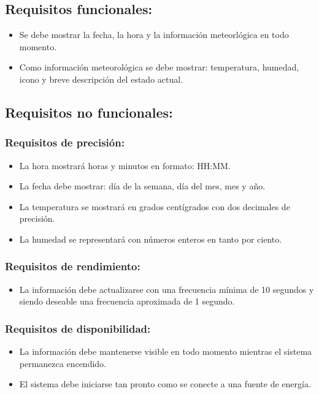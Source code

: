 \subsection{Requisitos funcionales:}
\begin{itemize}
    \item Se debe mostrar la fecha, la hora y la información meteorlógica
    en todo momento.
    \item Como información meteorológica se debe mostrar: temperatura, humedad, icono
    y breve descripción del estado actual.
\end{itemize}

\subsection{Requisitos no funcionales:}

\subsubsection{Requisitos de precisión:}
\begin{itemize}
    \item La hora mostrará horas y minutos en formato: HH:MM.
    \item La fecha debe mostrar: día de la semana, día del mes, mes y año.
    \item La temperatura se mostrará en grados centígrados con dos decimales de precisión.
    \item La humedad se representará con números enteros en tanto por ciento.
\end{itemize}

\subsubsection{Requisitos de rendimiento:}
\begin{itemize}
    \item La información debe actualizarse con una frecuencia mínima de 10 segundos y
    siendo deseable una frecuencia aproximada de 1 segundo.
\end{itemize}

\subsubsection{Requisitos de disponibilidad:}
\begin{itemize}
    \item La información debe mantenerse visible en todo momento mientras el sistema
    permanezca encendido.
    \item El sistema debe iniciarse tan pronto como se conecte a una fuente de energía.
\end{itemize}

